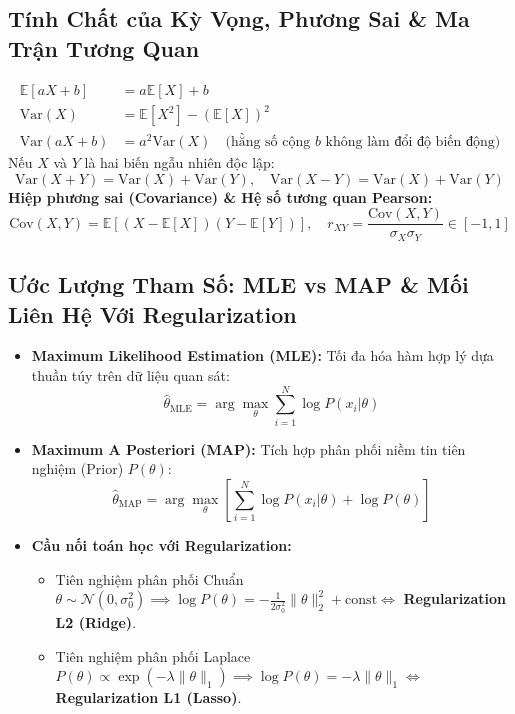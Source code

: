 \documentclass[10pt,a4paper]{article}
\begin{document}
\subsection{Tính Chất của Kỳ Vọng, Phương Sai \& Ma Trận Tương Quan}
\begin{align}
    \mathbb{E}[aX + b] &= a\mathbb{E}[X] + b \\
    \text{Var}(X) &= \mathbb{E}[X^2] - (\mathbb{E}[X])^2 \\
    \text{Var}(aX + b) &= a^2 \text{Var}(X) \quad \text{(hằng số cộng } b \text{ không làm đổi độ biến động)}
\end{align}
Nếu $X$ và $Y$ là hai biến ngẫu nhiên độc lập:
\begin{equation}
    \text{Var}(X + Y) = \text{Var}(X) + \text{Var}(Y), \quad \text{Var}(X - Y) = \text{Var}(X) + \text{Var}(Y)
\end{equation}
\textbf{Hiệp phương sai (Covariance) \& Hệ số tương quan Pearson:}
\begin{equation}
    \text{Cov}(X, Y) = \mathbb{E}[(X - \mathbb{E}[X])(Y - \mathbb{E}[Y])], \quad r_{XY} = \frac{\text{Cov}(X, Y)}{\sigma_X \sigma_Y} \in [-1, 1]
\end{equation}

\subsection{Ước Lượng Tham Số: MLE vs MAP \& Mối Liên Hệ Với Regularization}
\begin{itemize}[leftmargin=*]
    \item \textbf{Maximum Likelihood Estimation (MLE):} Tối đa hóa hàm hợp lý dựa thuần túy trên dữ liệu quan sát:
    \begin{equation}
        \hat{\theta}_{\text{MLE}} = \arg\max_\theta \sum_{i=1}^N \log P(x_i | \theta)
    \end{equation}
    \item \textbf{Maximum A Posteriori (MAP):} Tích hợp phân phối niềm tin tiên nghiệm (Prior) $P(\theta)$:
    \begin{equation}
        \hat{\theta}_{\text{MAP}} = \arg\max_\theta \left[ \sum_{i=1}^N \log P(x_i | \theta) + \log P(\theta) \right]
    \end{equation}
    \item \textbf{Cầu nối toán học với Regularization:}
    \begin{itemize}
        \item Tiên nghiệm phân phối Chuẩn $\theta \sim \mathcal{N}(0, \sigma_0^2) \implies \log P(\theta) = -\frac{1}{2\sigma_0^2} \|\theta\|_2^2 + \text{const} \iff$ \textbf{Regularization L2 (Ridge)}.
        \item Tiên nghiệm phân phối Laplace $P(\theta) \propto \exp(-\lambda \|\theta\|_1) \implies \log P(\theta) = -\lambda \|\theta\|_1 \iff$ \textbf{Regularization L1 (Lasso)}.
    \end{itemize}
\end{itemize}
\end{document}
